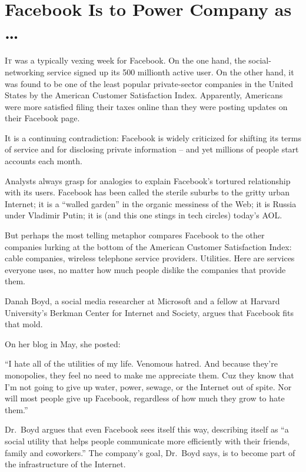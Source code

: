 ﻿\documentclass[12pt]{article}
\begin{document}
\section{Facebook Is to Power Company as \ldots}

\lettrine{I}{t} was a typically vexing week for Facebook. On the one hand,
the social-networking service signed up its 500 millionth active user. On the other hand, it was
found to be one of the least popular private-sector companies in the United States by the American
Customer Satisfaction Index. Apparently, Americans were more satisfied filing their taxes online
than they were posting updates on their Facebook page.

It is a continuing contradiction: Facebook is widely criticized for shifting its terms of service
and for disclosing private information -- and yet millions of people start accounts each month.

Analysts always grasp for analogies to explain Facebook's tortured relationship with its users.
Facebook has been called the sterile suburbs to the gritty urban Internet; it is a ``walled garden''
in the organic messiness of the Web; it is Russia under Vladimir Putin; it is (and this one stings
in tech circles) today's AOL.

But perhaps the most telling metaphor compares Facebook to the other companies lurking at the bottom
of the American Customer Satisfaction Index: cable companies, wireless telephone service providers.
Utilities. Here are services everyone uses, no matter how much people dislike the companies that
provide them.

Danah Boyd, a social media researcher at Microsoft and a fellow at Harvard University's Berkman
Center for Internet and Society, argues that Facebook fits that mold.

On her blog in May, she posted:

``I hate all of the utilities of my life. Venomous hatred. And because they're monopolies, they feel
no need to make me appreciate them. Cuz they know that I'm not going to give up water, power,
sewage, or the Internet out of spite. Nor will most people give up Facebook, regardless of how much
they grow to hate them.''

Dr.~Boyd argues that even Facebook sees itself this way, describing itself as ``a social utility
that helps people communicate more efficiently with their friends, family and coworkers.'' The
company's goal, Dr.~Boyd says, is to become part of the infrastructure of the Internet.
\end{document}
